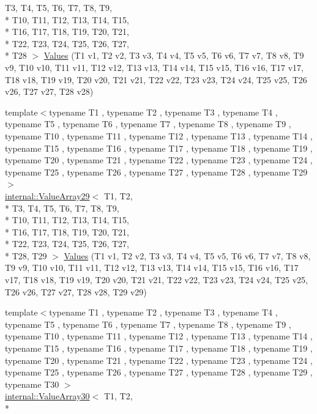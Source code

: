 \begin{DoxyCompactItemize}
T3, T4, T5, T6, T7, T8, T9, \\*
T10, T11, T12, T13, T14, T15, \\*
T16, T17, T18, T19, T20, T21, \\*
T22, T23, T24, T25, T26, T27, \\*
T28 $>$ \hyperlink{namespacetesting_a5785254e0510108d9d422e32ba18f170}{Values} (T1 v1, T2 v2, T3 v3, T4 v4, T5 v5, T6 v6, T7 v7, T8 v8, T9 v9, T10 v10, T11 v11, T12 v12, T13 v13, T14 v14, T15 v15, T16 v16, T17 v17, T18 v18, T19 v19, T20 v20, T21 v21, T22 v22, T23 v23, T24 v24, T25 v25, T26 v26, T27 v27, T28 v28)
\item 
{\footnotesize template$<$typename T1 , typename T2 , typename T3 , typename T4 , typename T5 , typename T6 , typename T7 , typename T8 , typename T9 , typename T10 , typename T11 , typename T12 , typename T13 , typename T14 , typename T15 , typename T16 , typename T17 , typename T18 , typename T19 , typename T20 , typename T21 , typename T22 , typename T23 , typename T24 , typename T25 , typename T26 , typename T27 , typename T28 , typename T29 $>$ }\\\hyperlink{classtesting_1_1internal_1_1ValueArray29}{internal\-::\-Value\-Array29}$<$ T1, T2, \\*
T3, T4, T5, T6, T7, T8, T9, \\*
T10, T11, T12, T13, T14, T15, \\*
T16, T17, T18, T19, T20, T21, \\*
T22, T23, T24, T25, T26, T27, \\*
T28, T29 $>$ \hyperlink{namespacetesting_a3d8a9bd3f027d89ff2873e3f0ff396cb}{Values} (T1 v1, T2 v2, T3 v3, T4 v4, T5 v5, T6 v6, T7 v7, T8 v8, T9 v9, T10 v10, T11 v11, T12 v12, T13 v13, T14 v14, T15 v15, T16 v16, T17 v17, T18 v18, T19 v19, T20 v20, T21 v21, T22 v22, T23 v23, T24 v24, T25 v25, T26 v26, T27 v27, T28 v28, T29 v29)
\item 
{\footnotesize template$<$typename T1 , typename T2 , typename T3 , typename T4 , typename T5 , typename T6 , typename T7 , typename T8 , typename T9 , typename T10 , typename T11 , typename T12 , typename T13 , typename T14 , typename T15 , typename T16 , typename T17 , typename T18 , typename T19 , typename T20 , typename T21 , typename T22 , typename T23 , typename T24 , typename T25 , typename T26 , typename T27 , typename T28 , typename T29 , typename T30 $>$ }\\\hyperlink{classtesting_1_1internal_1_1ValueArray30}{internal\-::\-Value\-Array30}$<$ T1, T2, \\*

\end{DoxyCompactItemize}
